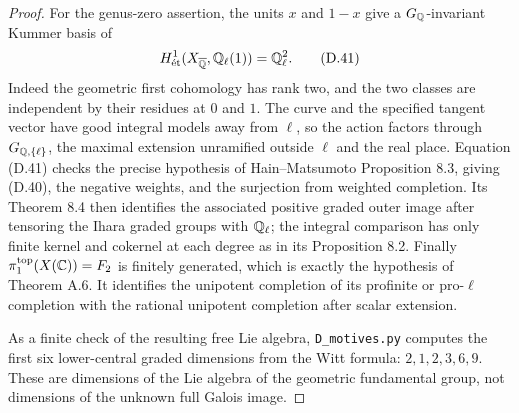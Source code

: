 \begin{proof}
For the genus-zero assertion, the units \(x\) and \(1-x\)
give a \(G_\mathbb Q\)-invariant Kummer basis of
\[
 H^1_{\mathrm{\acute et}}(X_{\overline{\mathbb Q}},\mathbb Q_\ell(1))
       =\mathbb Q_\ell^2 .
 \tag{D.41}
\]
Indeed the geometric first cohomology has rank two, and
the two classes are independent by their residues at
\(0\) and \(1\).
The curve and the specified tangent vector have good
integral models away from \(\ell\), so the action factors
through \(G_{\mathbb Q,\{\ell\}}\), the maximal extension
unramified outside \(\ell\) and the real place.
Equation (D.41) checks the precise hypothesis of
Hain--Matsumoto Proposition 8.3, giving (D.40), the
negative weights, and the surjection from weighted
completion.  Its Theorem 8.4 then identifies the
associated positive graded outer image after tensoring
the Ihara graded groups with \(\mathbb Q_\ell\); the integral
comparison has only finite kernel and cokernel at each
degree as in its Proposition 8.2.
Finally \(\pi_1^{\mathrm{top}}(X(\mathbb C))=F_2\) is finitely
generated, which is exactly the hypothesis of Theorem A.6.
It identifies the unipotent completion of its profinite
or pro-\(\ell\) completion with the rational unipotent
completion after scalar extension.

As a finite check of the resulting free Lie algebra,
\texttt{D\_motives.py} computes the first six lower-central
graded dimensions from the Witt formula:
\(2,1,2,3,6,9\).  These are dimensions of the Lie algebra
of the geometric fundamental group, not dimensions of
the unknown full Galois image.
\end{proof}

